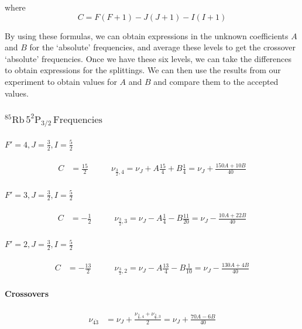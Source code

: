 \documentclass[12pt]{article}
\begin{document}
where
$$C = F(F+1) - J(J+1) - I(I+1)$$

By using these formulas, we can obtain expressions in the unknown coefficients $A$ and $B$ for the `absolute' frequencies, and average these levels to get the crossover `absolute' frequencies.  Once we have these six levels, we can take the differences to obtain expressions for the splittings.  We can then use the results from our experiment to obtain values for $A$ and $B$ and compare them to the accepted values.

\subsubsection*{${}^{85}\text{Rb}\,5^2\text{P}_{3/2}\,\text{Frequencies}$}

\paragraph{$F' = 4, J = \frac{3}{2}, I = \frac{5}{2}$}
\begin{align*}
C &= \frac{15}{2}\qquad
&\nu_{\frac{3}{2},4} = \nu_J + A \frac{15}{4} + B\frac{1}{4}= \nu_J +  \frac{150A+10B}{40}
\end{align*}

\paragraph{$F' = 3, J = \frac{3}{2}, I = \frac{5}{2}$}
\begin{align*}
	C &= -\frac{1}{2}\qquad
	&\nu_{\frac{3}{2},3} = \nu_J - A \frac{1}{4} - B\frac{11}{20}= \nu_J - \frac{10A+22B}{40}
\end{align*}

\paragraph{$F' = 2, J = \frac{3}{2}, I = \frac{5}{2}$}
\begin{align*}
	C &= -\frac{13}{2}\qquad
	&\nu_{\frac{3}{2},2} = \nu_J - A \frac{13}{4} - B\frac{1}{10} = \nu_J - \frac{130A+4B}{40}
\end{align*}

\paragraph{Crossovers}
\begin{align*}
	\nu_{\bar{43}} &= \nu_J + \frac{\nu_{\frac{3}{2},4} + \nu_{\frac{3}{2},3}}{2} = \nu_J + \frac{70A-6B}{40}
\end{align*}
\end{document}

